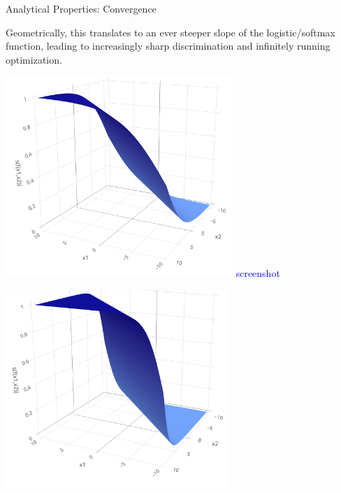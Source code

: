 \begin{vbframe}{Analytical Properties: Convergence}
\begin{minipage}[b]{0.55\textwidth}
  \footnotesize
  Geometrically, this translates to an ever steeper slope of the 
  logistic/softmax function, leading to increasingly sharp discrimination and 
  infinitely running optimization.
\end{minipage}%
\begin{minipage}[b]{0.05\textwidth}
  \phantom{foo}
\end{minipage}%
\begin{minipage}[b]{0.2\textwidth}
  \includegraphics[width=\textwidth]{figure_man/snap_softmax_1}
  \textcolor{blue}{screenshot}
\end{minipage}%
\begin{minipage}[b]{0.2\textwidth}
  \includegraphics[width=\textwidth]{figure_man/snap_softmax_2}
\end{minipage}%


\end{vbframe}
